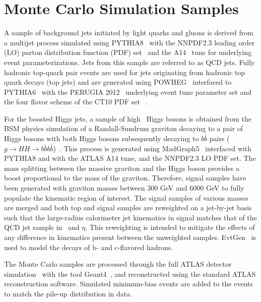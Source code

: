 \section{Monte Carlo Simulation Samples}
\label{sec:mc}

\par A sample of background jets initiated by light quarks and gluons is derived from a multijet process simulated using PYTHIA8~\cite{Sjostrand:2007gs} with the NNPDF2.3 leading order (LO) parton distribution function (PDF) set~\cite{Ball:2012cx} and the A14~\cite{ATL-PHYS-PUB-2014-021} tune for underlying event parameterizations. 
Jets from this sample are referred to as QCD jets. Fully hadronic top-quark pair events are used for jets originating from hadronic top quark decays (top jets) and are generated using POWHEG~\cite{Frixione:2007vw,Nason:2004rx} interfaced to PYTHIA6~\cite{Sjostrand:2006za} with the PERUGIA 2012~\cite{Skands:2010ak} underlying event tune parameter set and the four flavor scheme of the CT10 PDF set ~\cite{Gao:2013xoa}.
\par For the boosted Higgs jets, a sample of high \pt~Higgs bosons is obtained from the BSM physics simulation of a Randall-Sundrum graviton decaying to a pair of Higgs bosons with both Higgs bosons subsequently decaying to $b\bar{b}$ pairs ($g\rightarrow HH \rightarrow b\bar{b}b\bar{b}$)~\cite{Randall:1999ee}. This process is generated using MadGraph5~\cite{Alwall:2014hca} 
interfaced with PYTHIA8 and with the ATLAS A14 tune, and the NNPDF2.3 LO PDF set. The mass splitting between the massive graviton and the Higgs boson provides a boost proportional to the mass of the graviton. 
Therefore, signal samples have been generated with graviton masses between 300 GeV and 6000 GeV to fully populate the kinematic region of interest. 
The signal samples of various masses are merged and both top and signal samples are reweighted on a jet-by-jet basis such that the large-radius calorimeter jet kinematics in signal matches that of the QCD jet sample in \pt~and $\eta$. 
This reweighting is intended to mitigate the effects of any difference in kinematics present between the unweighted samples. 
EvtGen~\cite{Lange:2001uf} is used to model the decays of b- and c-flavored hadrons.
\par The Monte Carlo samples are processed through the full ATLAS detector simulation~\cite{Aad:2010ah} with the tool Geant4~\cite{Agostinelli:2002hh}, and reconstructed using the standard ATLAS reconstruction software. Simulated minimum-bias events are added to the events to match the pile-up distribution in data. 


